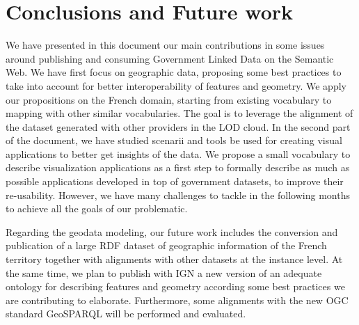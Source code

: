 \documentclass[a4paper,11pt]{report}
\begin{document}



   


\chapter{Conclusions and Future work}

We have presented in this document our main contributions in some issues around publishing and consuming Government Linked Data on the Semantic Web. We have first focus on geographic data, proposing some best practices to take into account for better interoperability of features and geometry.
We apply our propositions on the French domain, starting from existing vocabulary to mapping with other similar vocabularies. The goal is to leverage the alignment of the dataset generated with other providers in the LOD cloud. In the second part of the document, we have studied scenarii and tools 
be used for creating visual applications to better get insights of the data. We propose a small vocabulary to describe visualization applications as a first step to formally describe as much as possible applications developed in top of government datasets, to improve their re-usability. However, we have many challenges to tackle in the following months to achieve all the goals of our problematic.       

Regarding the geodata modeling, our future work includes the conversion and publication of a large RDF dataset of geographic information of the French territory together with alignments with other datasets at the instance level. At the same time, we plan to publish with IGN a new version of an adequate ontology for describing features and geometry according some best practices we are contributing to elaborate. Furthermore, some alignments with the new OGC standard GeoSPARQL will be performed and evaluated.
\end{document}
